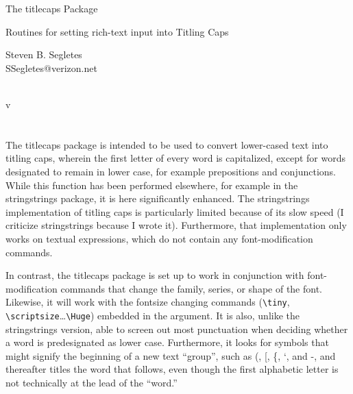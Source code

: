 \documentclass{article}
\def\tcp{\textsf{titlecaps}}
\let\vb\verb
\begin{document}
\begin{center}
\LARGE The {\tcp} Package\\
\rule{0em}{.7em}\small Routines for setting rich-text input into
Titling Caps\\
\rule{0em}{2.7em}\large Steven B. Segletes\\
SSegletes@verizon.net\\
\rule{0em}{1.7em}\titlecapsVersionDate\\
v\titlecapsVersionNumber
\end{center}

\section{}

The {\tcp} package is intended to be used to convert lower-cased text
into titling caps, wherein the first letter of every word is
capitalized, except for words designated to remain in lower case, for
example prepositions and conjunctions.  While this function has been
performed elsewhere, for example in the \textsf{stringstrings} package,
it is here significantly enhanced.  The \textsf{stringstrings}
implementation of titling caps is particularly limited because of its
slow speed (I criticize \textsf{stringstrings} because I wrote it).
Furthermore, that implementation only works on textual expressions,
which do not contain any font-modification commands.  

In contrast, the {\tcp} package is set up to work in conjunction with
font-modification commands that change the family, series, or shape of
the font.  Likewise, it will work with the fontsize changing commands
(\vb|\tiny|, \vb|\scriptsize|\ldots\SoftSpace\vb|\Huge|) embedded in the
argument.  It is also, unlike the \textsf{stringstrings} version, able
to screen out most punctuation when deciding whether a word is
predesignated as lower case.  Furthermore, it looks for symbols that
might signify the beginning of a new text ``group'', such as (, [, \{,
`, and -, and thereafter titles the word that follows, even though the
first alphabetic letter is not technically at the lead of the ``word.''
\end{document}

